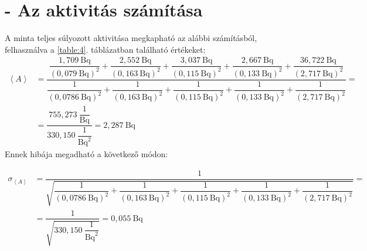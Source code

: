 \appendix
\renewcommand{\thesection}{APPENDIX \Alph{section}}
\section{ - Az aktivitás számítása} \label{appendix:A}
A minta teljes súlyozott aktivitása megkapható az alábbi számításból, felhasználva a \ref{table:4}. táblázatban található értékeket:
\begin{align}
\left< A \right>
&=
\dfrac{
\dfrac{1,709\ \text{Bq}}{\left( 0,079\ \text{Bq} \right)^{2}}
+
\dfrac{2,552\ \text{Bq}}{\left( 0,163\ \text{Bq} \right)^{2}}
+
\dfrac{3,037\ \text{Bq}}{\left( 0,115\ \text{Bq} \right)^{2}}
+
\dfrac{2,667\ \text{Bq}}{\left( 0,133\ \text{Bq} \right)^{2}}
+
\dfrac{36,722\ \text{Bq}}{\left( 2,717\ \text{Bq} \right)^{2}}
}{
\dfrac{1}{\left( 0,0786\ \text{Bq} \right)^{2}}
+
\dfrac{1}{\left( 0,163\ \text{Bq} \right)^{2}}
+
\dfrac{1}{\left( 0,115\ \text{Bq} \right)^{2}}
+
\dfrac{1}{\left( 0,133\ \text{Bq} \right)^{2}}
+
\dfrac{1}{\left( 2,717\ \text{Bq} \right)^{2}}
}
= \nonumber \\
&=
\dfrac{755,273\ \dfrac{1}{\text{Bq}}}{330,150\ \dfrac{1}{\text{Bq}^{2}}}
=
2,287\ \text{Bq}
\end{align}
Ennek hibája megadható a következő módon:

\begin{align}
\sigma_{\left< A \right>}
&=
\dfrac{1}{\sqrt{
\dfrac{1}{\left( 0,0786\ \text{Bq} \right)^{2}}
+
\dfrac{1}{\left( 0,163\ \text{Bq} \right)^{2}}
+
\dfrac{1}{\left( 0,115\ \text{Bq} \right)^{2}}
+
\dfrac{1}{\left( 0,133\ \text{Bq} \right)^{2}}
+
\dfrac{1}{\left( 2,717\ \text{Bq} \right)^{2}}
}}
= \nonumber \\
&=
\dfrac{1}{\sqrt{330,150\ \dfrac{1}{\text{Bq}^{2}}}}
=
0,055\ \text{Bq}
\end{align}
\newpage
